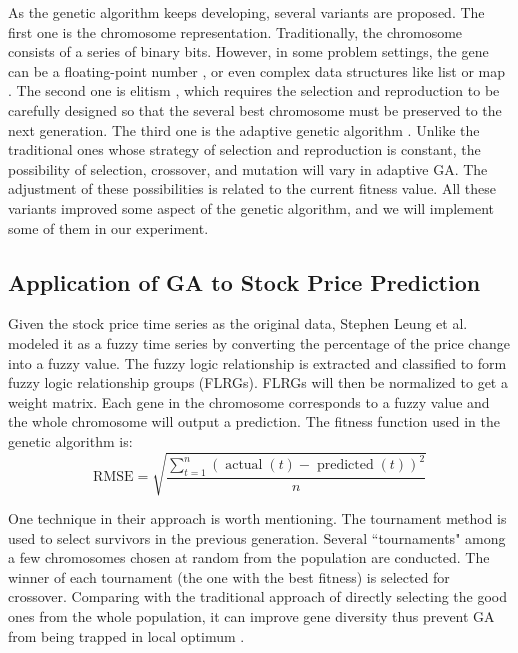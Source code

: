 \documentclass{article}
\begin{document}
As the genetic algorithm keeps developing, several variants are proposed.
The first one is the chromosome representation.
Traditionally, the chromosome consists of a series of binary bits.
However, in some problem settings, the gene can be a floating-point number
\cite{an-experimental-comparison-of-binary-and-floating}, or even complex data structures like
list or map \cite{helga-a-heterogeneous-encoding}.
The second one is elitism \cite{removing-the-genetics-from-the-standard-genetic-algorithm},
which requires the selection and reproduction to be carefully designed so that
the several best chromosome must be preserved to the next generation.
The third one is the adaptive genetic algorithm \cite{adaptive-probabilities-of-crossover-and-mutation}.
Unlike the traditional ones whose strategy of selection and reproduction is constant,
the possibility of selection, crossover, and mutation will vary in adaptive GA.
The adjustment of these possibilities is related to the current fitness value.
All these variants improved some aspect of the genetic algorithm,
and we will implement some of them in our experiment.


\subsection{Application of GA to Stock Price Prediction}

Given the stock price time series as the original data,
Stephen Leung et al. \cite{a-novel-stock-forecasting-model-based-on-fuzzy-time-series}
modeled it as a fuzzy time series
by converting the percentage of the price change into a fuzzy value.
The fuzzy logic relationship is extracted and classified to form fuzzy logic relationship groups (FLRGs).
FLRGs will then be normalized to get a weight matrix.
Each gene in the chromosome corresponds to a fuzzy value
and the whole chromosome will output a prediction.
The fitness function used in the genetic algorithm is:
$$
\text{RMSE} =
\sqrt{ \dfrac {\sum \limits_{t=1}^{n}\left(\operatorname{actual}(t) - \operatorname{predicted}(t)\right)^2 } {n}}
$$

One technique in their approach is worth mentioning.
The tournament method is used to select survivors in the previous generation.
Several ``tournaments" among a few chromosomes chosen at random from the population are conducted.
The winner of each tournament (the one with the best fitness) is selected for crossover.
Comparing with the traditional approach of directly selecting the good ones from the whole population,
it can improve gene diversity thus prevent GA from being trapped in local optimum
\cite{a-note-on-boltzmann-tournament-selection}.
\end{document}
